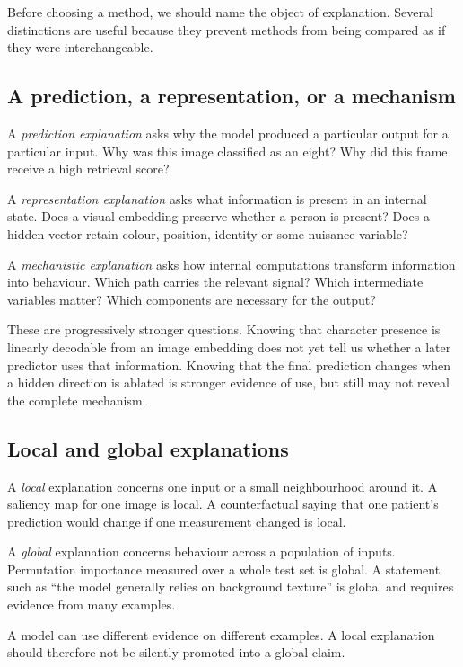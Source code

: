 Before choosing a method, we should name the object of explanation. Several distinctions are useful because they prevent methods from being compared as if they were interchangeable.

\subsection{A prediction, a representation, or a mechanism}

A \emph{prediction explanation} asks why the model produced a particular output for a particular input. Why was this image classified as an eight? Why did this frame receive a high retrieval score?

A \emph{representation explanation} asks what information is present in an internal state. Does a visual embedding preserve whether a person is present? Does a hidden vector retain colour, position, identity or some nuisance variable?

A \emph{mechanistic explanation} asks how internal computations transform information into behaviour. Which path carries the relevant signal? Which intermediate variables matter? Which components are necessary for the output?

These are progressively stronger questions. Knowing that character presence is linearly decodable from an image embedding does not yet tell us whether a later predictor uses that information. Knowing that the final prediction changes when a hidden direction is ablated is stronger evidence of use, but still may not reveal the complete mechanism.

\subsection{Local and global explanations}

A \emph{local} explanation concerns one input or a small neighbourhood around it. A saliency map for one image is local. A counterfactual saying that one patient's prediction would change if one measurement changed is local.

A \emph{global} explanation concerns behaviour across a population of inputs. Permutation importance measured over a whole test set is global. A statement such as ``the model generally relies on background texture'' is global and requires evidence from many examples.

A model can use different evidence on different examples. A local explanation should therefore not be silently promoted into a global claim.

